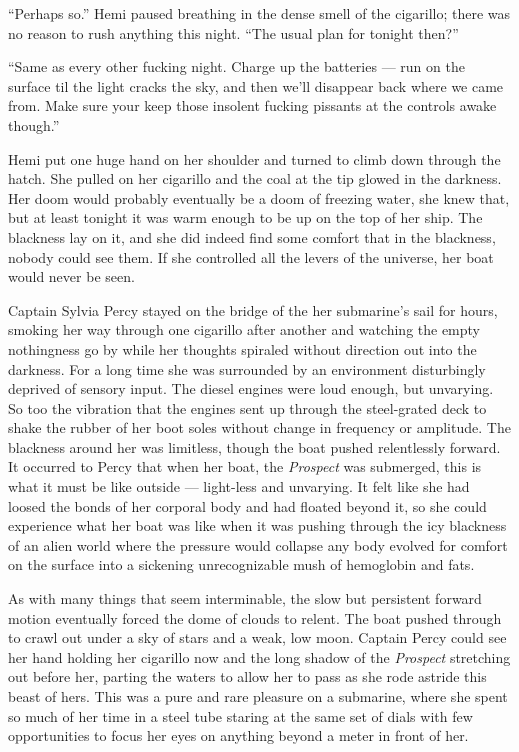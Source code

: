 \documentclass[
]{scrbook}
\begin{document}
``Perhaps so.'' Hemi paused breathing in the dense smell of the
cigarillo; there was no reason to rush anything this night. ``The usual
plan for tonight then?''

``Same as every other fucking night. Charge up the batteries --- run on
the surface til the light cracks the sky, and then we'll disappear back
where we came from. Make sure your keep those insolent fucking pissants
at the controls awake though.''

Hemi put one huge hand on her shoulder and turned to climb down through
the hatch. She pulled on her cigarillo and the coal at the tip glowed in
the darkness. Her doom would probably eventually be a doom of freezing
water, she knew that, but at least tonight it was warm enough to be up
on the top of her ship. The blackness lay on it, and she did indeed find
some comfort that in the blackness, nobody could see them. If she
controlled all the levers of the universe, her boat would never be seen.

Captain Sylvia Percy stayed on the bridge of the her submarine's sail
for hours, smoking her way through one cigarillo after another and
watching the empty nothingness go by while her thoughts spiraled without
direction out into the darkness. For a long time she was surrounded by
an environment disturbingly deprived of sensory input. The diesel
engines were loud enough, but unvarying. So too the vibration that the
engines sent up through the steel-grated deck to shake the rubber of her
boot soles without change in frequency or amplitude. The blackness
around her was limitless, though the boat pushed relentlessly forward.
It occurred to Percy that when her boat, the \emph{Prospect} was
submerged, this is what it must be like outside --- light-less and
unvarying. It felt like she had loosed the bonds of her corporal body
and had floated beyond it, so she could experience what her boat was
like when it was pushing through the icy blackness of an alien world
where the pressure would collapse any body evolved for comfort on the
surface into a sickening unrecognizable mush of hemoglobin and fats.

As with many things that seem interminable, the slow but persistent
forward motion eventually forced the dome of clouds to relent. The boat
pushed through to crawl out under a sky of stars and a weak, low moon.
Captain Percy could see her hand holding her cigarillo now and the long
shadow of the \emph{Prospect} stretching out before her, parting the
waters to allow her to pass as she rode astride this beast of hers. This
was a pure and rare pleasure on a submarine, where she spent so much of
her time in a steel tube staring at the same set of dials with few
opportunities to focus her eyes on anything beyond a meter in front of
her.
\end{document}
